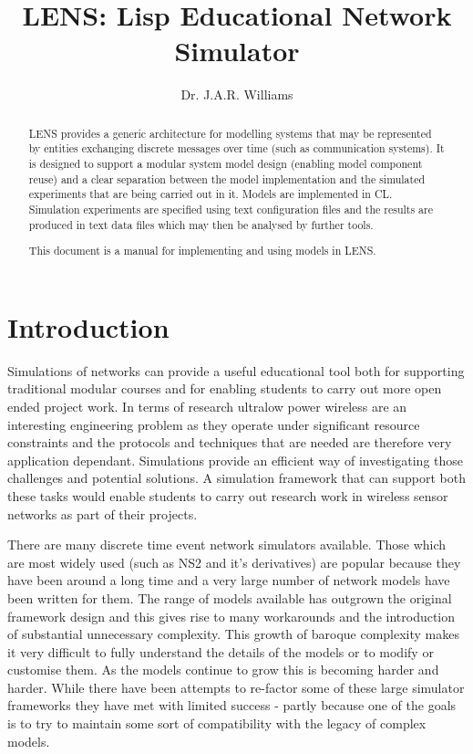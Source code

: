 \documentclass[a4paper,11pt,twoside,openany]{report}
\title{LENS: Lisp Educational Network Simulator}
\author{Dr. J.A.R. Williams}
\newcommand{\acr}[1]{\acrshort{#1}}
\begin{document}
\maketitle

\tableofcontents

\begin{abstract}
  \acrfull{LENS} provides a generic architecture for modelling systems
  that may be represented by entities exchanging discrete messages
  over time (such as communication systems). It is designed to support
  a modular system model design (enabling model component reuse) and a
  clear separation between the model implementation and the simulated
  experiments that are being carried out in it. Models are implemented
  in \gls{CL}. Simulation experiments are specified using text
  configuration files and the results are produced in text data files
  which may then be analysed by further tools.

  This document is a manual for implementing and using models in
  \acr{LENS}.
\end{abstract}

\chapter{Introduction}
Simulations of networks can provide a useful educational tool both for
supporting traditional modular courses and for enabling students to
carry out more open ended project work. In terms of research ultralow
power wireless are an interesting engineering problem as they operate
under significant resource constraints and the protocols and
techniques that are needed are therefore very application dependant.
Simulations provide an efficient way of investigating those challenges
and potential solutions. A simulation framework that can support both
these tasks would enable students to carry out research work in
wireless sensor networks as part of their projects. 

There are many discrete time event network simulators available. Those
which are most widely used (such as NS2 and it's derivatives) are
popular because they have been around a long time and a very large
number of network models have been written for them. The range of
models available has outgrown the original framework design and this
gives rise to many workarounds and the introduction of substantial
unnecessary complexity. This growth of baroque complexity makes it
very difficult to fully understand the details of the models or to
modify or customise them. As the models continue to grow this is
becoming harder and harder. While there have been attempts to
re-factor some of these large simulator frameworks they have met with
limited success - partly because one of the goals is to try to
maintain some sort of compatibility with the legacy of complex models.
\end{document}
